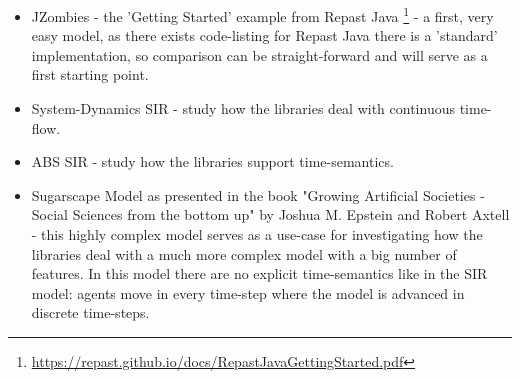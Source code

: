 \begin{itemize}
	\item JZombies - the 'Getting Started' example from Repast Java \footnote{\url{https://repast.github.io/docs/RepastJavaGettingStarted.pdf}} - a first, very easy model, as there exists code-listing for Repast Java there is a 'standard' implementation, so comparison can be straight-forward and will serve as a first starting point.
	
	\item System-Dynamics SIR - study how the libraries deal with continuous time-flow.
	
	\item ABS SIR - study how the libraries support time-semantics.
	
	\item Sugarscape Model as presented in the book "Growing Artificial Societies - Social Sciences from the bottom up" by Joshua M. Epstein and Robert Axtell \cite{epstein_growing_1996} - this highly complex model serves as a use-case for investigating how the libraries deal with a much more complex model with a big number of features. In this model there are no explicit time-semantics like in the SIR model: agents move in every time-step where the model is advanced in discrete time-steps.
\end{itemize}